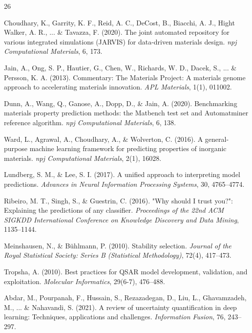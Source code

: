 \documentclass[11pt,a4paper,oneside]{report}
\begin{document}
\clearpage
\begin{thebibliography}{26}

Choudhary, K., Garrity, K. F., Reid, A. C., DeCost, B., Biacchi, A. J., Hight Walker, A. R., ... \& Tavazza, F. (2020). The joint automated repository for various integrated simulations (JARVIS) for data-driven materials design. \emph{npj Computational Materials}, 6, 173.

Jain, A., Ong, S. P., Hautier, G., Chen, W., Richards, W. D., Dacek, S., ... \& Persson, K. A. (2013). Commentary: The Materials Project: A materials genome approach to accelerating materials innovation. \emph{APL Materials}, 1(1), 011002.

Dunn, A., Wang, Q., Ganose, A., Dopp, D., \& Jain, A. (2020). Benchmarking materials property prediction methods: the Matbench test set and Automatminer reference algorithm. \emph{npj Computational Materials}, 6, 138.

Ward, L., Agrawal, A., Choudhary, A., \& Wolverton, C. (2016). A general-purpose machine learning framework for predicting properties of inorganic materials. \emph{npj Computational Materials}, 2(1), 16028.

Lundberg, S. M., \& Lee, S. I. (2017). A unified approach to interpreting model predictions. \emph{Advances in Neural Information Processing Systems}, 30, 4765--4774.

Ribeiro, M. T., Singh, S., \& Guestrin, C. (2016). "Why should I trust you?": Explaining the predictions of any classifier. \emph{Proceedings of the 22nd ACM SIGKDD International Conference on Knowledge Discovery and Data Mining}, 1135--1144.

Meinshausen, N., \& B{\"u}hlmann, P. (2010). Stability selection. \emph{Journal of the Royal Statistical Society: Series B (Statistical Methodology)}, 72(4), 417--473.

Tropsha, A. (2010). Best practices for QSAR model development, validation, and exploitation. \emph{Molecular Informatics}, 29(6-7), 476--488.

Abdar, M., Pourpanah, F., Hussain, S., Rezazadegan, D., Liu, L., Ghavamzadeh, M., ... \& Nahavandi, S. (2021). A review of uncertainty quantification in deep learning: Techniques, applications and challenges. \emph{Information Fusion}, 76, 243--297.


\end{thebibliography}
\end{document}
